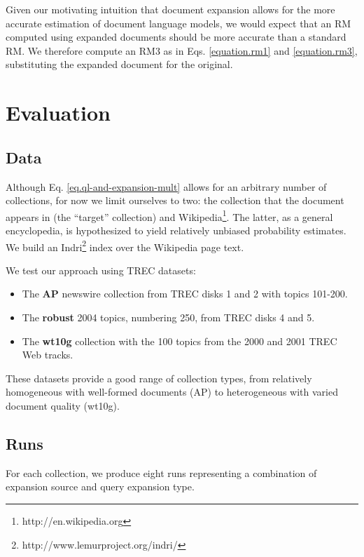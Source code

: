 \documentclass{sig-alternate}
\begin{document}
Given our motivating intuition that document expansion allows for the more accurate estimation of document language models, we would expect that an RM computed using expanded documents should be more accurate than a standard RM. We therefore compute an RM3 as in Eqs. \ref{equation.rm1} and \ref{equation.rm3}, substituting the expanded document for the original.

\section{Evaluation}\label{section.evaluation}

\subsection{Data}\label{section.evaluation.collections}

Although Eq. \ref{eq.ql-and-expansion-mult} allows for an arbitrary number of collections, for now we limit ourselves to two: the collection that the document appears in (the ``target'' collection) and Wikipedia\footnote{http://en.wikipedia.org}. The latter, as a general encyclopedia, is hypothesized to yield relatively unbiased probability estimates. We build an Indri\footnote{http://www.lemurproject.org/indri/} index over the Wikipedia page text.

We test our approach using TREC datasets:
\begin{itemize}
	\item The \textbf{AP} newswire collection from TREC disks 1 and 2 with topics 101-200.
	\item The \textbf{robust} 2004 topics, numbering 250, from TREC disks 4 and 5.
	\item The \textbf{wt10g} collection with the 100 topics from the 2000 and 2001 TREC Web tracks.
\end{itemize}

These datasets provide a good range of collection types, from relatively homogeneous with well-formed documents (AP) to heterogeneous with varied document quality (wt10g).

\subsection{Runs}\label{section.evaluation.runs}

For each collection, we produce eight runs representing a combination of expansion source and query expansion type.
\end{document}
